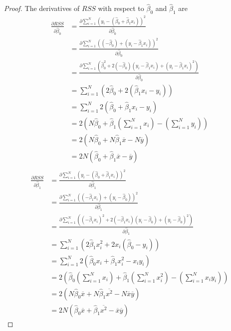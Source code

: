 \documentclass{article}
\theoremstyle{definition}
\theoremstyle{remark}
\theoremstyle{example}
\newcommand{\betat}{\hat{\beta}}
\newcommand{\mx}{\overline{x}}
\newcommand{\my}{\overline{y}}
\newcommand{\mxy}{\overline{x}\overline{y}}
\newcommand{\mxsquare}{\overline{x^2}}
\begin{document}
\begin{proof}
		The derivatives of $RSS$ with respect to $\betat_0$ and $\betat_1$ are
		\begin{align*}
				\frac{\partial RSS}{\partial \betat_0} &= \frac{\partial \sum_{i=1}^N (y_i - (\betat_0 + \betat_1 x_i))^2}{\partial \betat_0}\\
															   &= \frac{\partial \sum_{i=1}^N ((-\betat_0) + (y_i - \betat_1 x_i))^2}{\partial \betat_0}\\
															   &= \frac{\partial \sum_{i=1}^N (\betat_0^2 + 2 (-\betat_0) (y_i - \betat_1 x_i) + (y_i - \betat_1 x_i)^2)}{\partial \betat_0}\\
															   &= \sum_{i=1}^N (2\betat_0 + 2(\betat_1 x_i - y_i))\\
															   &= \sum_{i=1}^N 2(\betat_0 + \betat_1 x_i - y_i)\\
															   &=  2(N \betat_0 + \betat_1 (\sum_{i=1}^N x_i) - (\sum_{i=1}^N y_i))\\
															   &=  2(N \betat_0 + N \betat_1 \mx - N \my)\\
															   &=  2N(\betat_0 + \betat_1 \mx - \my)\\
		\end{align*}
		\begin{align*}
				\frac{\partial RSS}{\partial \betat_1} &= \frac{\partial \sum_{i=1}^N (y_i - (\betat_0 + \betat_1 x_i))^2}{\partial \betat_1}\\
															   &= \frac{\partial \sum_{i=1}^N ((-\betat_1 x_i) + (y_i - \betat_0))^2}{\partial \betat_1}\\
															   &= \frac{\partial \sum_{i=1}^N ((-\betat_1 x_i)^2 + 2(-\betat_1 x_i)(y_i - \betat_0) + (y_i - \betat_0)^2)}{\partial \betat_1}\\
															   &= \sum_{i=1}^N (2\betat_1 x_i^2 + 2x_i(\betat_0 - y_i))\\
															   &= \sum_{i=1}^N 2(\betat_0 x_i + \betat_1 x_i^2 - x_i y_i)\\
															   &= 2(\betat_0 (\sum_{i=1}^N x_i) + \betat_1 (\sum_{i=1}^N x_i^2) - (\sum_{i=1}^N x_i y_i))\\
															   &= 2(N \betat_0 \mx + N \betat_1 \mxsquare - N \mxy)\\
															   &= 2N(\betat_0 \mx + \betat_1 \mxsquare - \mxy)
		\end{align*}


\end{proof}
\end{document}
